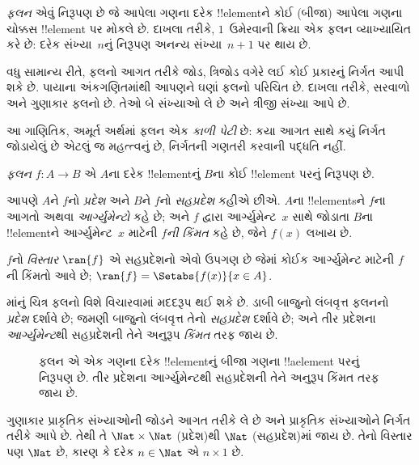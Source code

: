\documentclass[../../../include/open-logic-section]{subfiles}
\begin{document}

\begin{explain}
\emph{ફલન} એવું નિરૂપણ છે જે આપેલા ગણના દરેક !!{element}ને
કોઈ (બીજા) આપેલા ગણના ચોક્કસ !!{element} પર મોકલે છે.
દાખલા તરીકે, $1$~ઉમેરવાની ક્રિયા એક ફલન વ્યાખ્યાયિત કરે છે:
દરેક સંખ્યા~$n$નું નિરૂપણ અનન્ય સંખ્યા~$n+1$ પર થાય છે.

વધુ સામાન્ય રીતે, ફલનો આગત તરીકે જોડ, ત્રિજોડ વગેરે લઈ
કોઈ પ્રકારનું નિર્ગત આપી શકે છે. પાયાના અંકગણિતમાંથી આપણને
ઘણાં ફલનો પરિચિત છે. દાખલા તરીકે, સરવાળો અને ગુણાકાર
ફલનો છે. તેઓ બે સંખ્યાઓ લે છે અને ત્રીજી સંખ્યા આપે છે.

આ ગાણિતિક, અમૂર્ત અર્થમાં ફલન એક \emph{કાળી પેટી} છે:
કયા આગત સાથે કયું નિર્ગત જોડાયેલું છે એટલું જ મહત્ત્વનું છે,
નિર્ગતની ગણતરી કરવાની પદ્ધતિ નહીં.
\end{explain}

\begin{defn}[ફલન]
\emph{ફલન} $f \colon A \to B$ એ $A$ના દરેક !!{element}નું
$B$ના કોઈ !!{element} પરનું નિરૂપણ છે.

આપણે $A$ને $f$નો \emph{પ્રદેશ} અને $B$ને $f$નો
\emph{સહપ્રદેશ} કહીએ છીએ. $A$ના !!{element}sને $f$ના
આગતો અથવા \emph{આર્ગ્યુમેન્ટો} કહે છે; અને $f$ દ્વારા આર્ગ્યુમેન્ટ~$x$ સાથે
જોડાતા $B$ના !!{element}ને આર્ગ્યુમેન્ટ~$x$ માટેની
\emph{$f$ની કિંમત} કહે છે, જેને $f(x)$ લખાય છે.

$f$નો \emph{વિસ્તાર} $\ran{f}$ એ સહપ્રદેશનો એવો ઉપગણ છે
જેમાં કોઈક આર્ગ્યુમેન્ટ માટેની $f$ની કિંમતો આવે છે;
$\ran{f} =
\Setabs{f(x)}{x \in A}$.
\end{defn}

માંનું ચિત્ર ફલનો વિશે વિચારવામાં મદદરૂપ
થઈ શકે છે. ડાબી બાજુનો લંબવૃત્ત ફલનનો \emph{પ્રદેશ}
દર્શાવે છે; જમણી બાજુનો લંબવૃત્ત તેનો \emph{સહપ્રદેશ}
દર્શાવે છે; અને તીર પ્રદેશના \emph{આર્ગ્યુમેન્ટ}થી સહપ્રદેશની
તેને અનુરૂપ \emph{કિંમત} તરફ જાય છે.

\begin{figure}
  \caption{ફલન એ એક ગણના દરેક !!{element}નું બીજા ગણના
    !!a{element} પરનું નિરૂપણ છે. તીર પ્રદેશના આર્ગ્યુમેન્ટથી
    સહપ્રદેશની તેને અનુરૂપ કિંમત તરફ જાય છે.}
\end{figure}

\begin{ex}
ગુણાકાર પ્રાકૃતિક સંખ્યાઓની જોડને આગત તરીકે લે છે અને
પ્રાકૃતિક સંખ્યાઓને નિર્ગત તરીકે આપે છે. તેથી તે
$\Nat \times \Nat$ (પ્રદેશ)થી $\Nat$ (સહપ્રદેશ)માં જાય છે.
તેનો વિસ્તાર પણ $\Nat$ છે, કારણ કે દરેક $n \in \Nat$
એ $n \times 1$ છે.
\end{ex}
\end{document}

